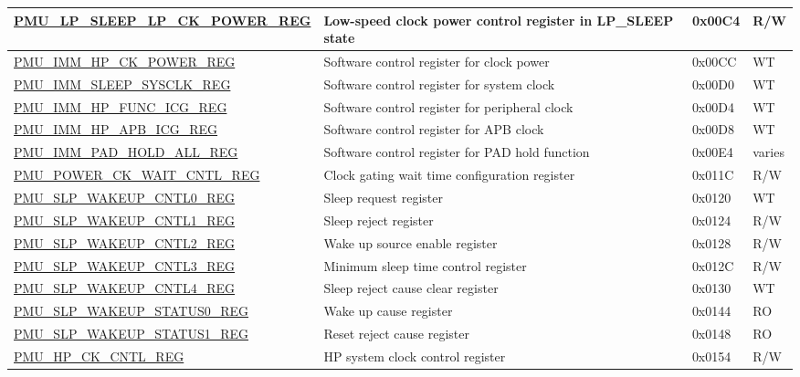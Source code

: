 \begin{longtable}{ | l | L{6cm} | l | l | }
\hyperref[regdesc:PMULPSLEEPLPCKPOWERREG]{PMU\_LP\_SLEEP\_LP\_CK\_POWER\_REG} & Low-speed clock power control register in LP\_SLEEP state & 0x00C4 & R/W \\ \hline
\hyperref[regdesc:PMUIMMHPCKPOWERREG]{PMU\_IMM\_HP\_CK\_POWER\_REG} & Software control register for clock power & 0x00CC & WT \\ \hline
\hyperref[regdesc:PMUIMMSLEEPSYSCLKREG]{PMU\_IMM\_SLEEP\_SYSCLK\_REG} & Software control register for system clock & 0x00D0 & WT \\ \hline
\hyperref[regdesc:PMUIMMHPFUNCICGREG]{PMU\_IMM\_HP\_FUNC\_ICG\_REG} & Software control register for peripheral clock & 0x00D4 & WT \\ \hline
\hyperref[regdesc:PMUIMMHPAPBICGREG]{PMU\_IMM\_HP\_APB\_ICG\_REG} & Software control register for APB clock & 0x00D8 & WT \\ \hline
\hyperref[regdesc:PMUIMMPADHOLDALLREG]{PMU\_IMM\_PAD\_HOLD\_ALL\_REG} & Software control register for PAD hold function & 0x00E4 & varies \\ \hline
\hyperref[regdesc:PMUPOWERCKWAITCNTLREG]{PMU\_POWER\_CK\_WAIT\_CNTL\_REG} & Clock gating wait time configuration register & 0x011C & R/W \\ \hline
\hyperref[regdesc:PMUSLPWAKEUPCNTL0REG]{PMU\_SLP\_WAKEUP\_CNTL0\_REG} & Sleep request register & 0x0120 & WT \\ \hline
\hyperref[regdesc:PMUSLPWAKEUPCNTL1REG]{PMU\_SLP\_WAKEUP\_CNTL1\_REG} & Sleep reject register & 0x0124 & R/W \\ \hline
\hyperref[regdesc:PMUSLPWAKEUPCNTL2REG]{PMU\_SLP\_WAKEUP\_CNTL2\_REG} & Wake up source enable register & 0x0128 & R/W \\ \hline
\hyperref[regdesc:PMUSLPWAKEUPCNTL3REG]{PMU\_SLP\_WAKEUP\_CNTL3\_REG} & Minimum sleep time control register & 0x012C & R/W \\ \hline
\hyperref[regdesc:PMUSLPWAKEUPCNTL4REG]{PMU\_SLP\_WAKEUP\_CNTL4\_REG} & Sleep reject cause clear register & 0x0130 & WT \\ \hline
\hyperref[regdesc:PMUSLPWAKEUPSTATUS0REG]{PMU\_SLP\_WAKEUP\_STATUS0\_REG} & Wake up cause register & 0x0144 & RO \\ \hline
\hyperref[regdesc:PMUSLPWAKEUPSTATUS1REG]{PMU\_SLP\_WAKEUP\_STATUS1\_REG} & Reset reject cause register & 0x0148 & RO \\ \hline

\hyperref[regdesc:PMUHPCKCNTLREG]{PMU\_HP\_CK\_CNTL\_REG} & HP system clock control register & 0x0154 & R/W \\ \hline


\end{longtable}
